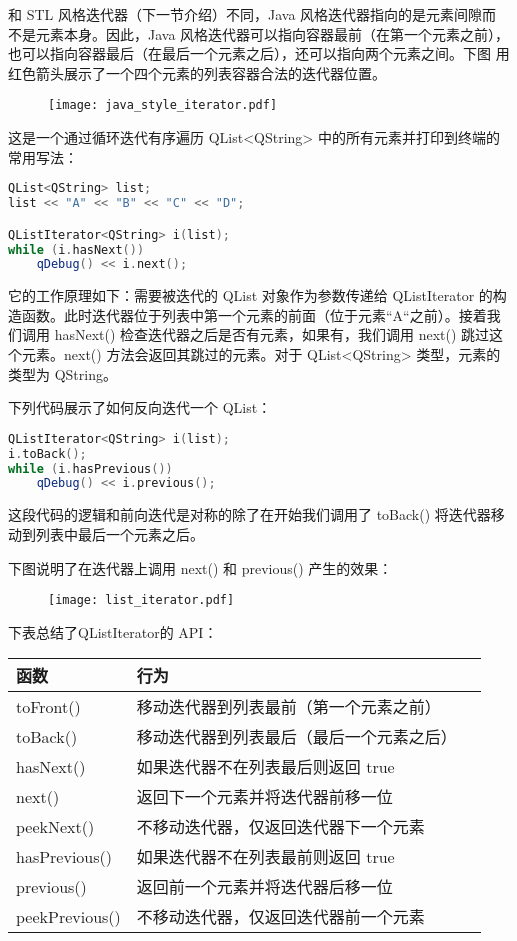 和 STL 风格迭代器（下一节介绍）不同，Java 风格迭代器指向的是元素间隙而
不是元素本身。因此，Java 风格迭代器可以指向容器最前（在第一个元素之前），
也可以指向容器最后（在最后一个元素之后），还可以指向两个元素之间。下图
用红色箭头展示了一个四个元素的列表容器合法的迭代器位置。

\begin{figure}[hbt!]  
	\centering
    \texttt{[image: java\_style\_iterator.pdf]}
\end{figure}

这是一个通过循环迭代有序遍历 QList<QString> 中的所有元素并打印到终端的
常用写法：

\begin{lstlisting}[language=C++]
QList<QString> list;
list << "A" << "B" << "C" << "D";

QListIterator<QString> i(list);
while (i.hasNext())
    qDebug() << i.next();

\end{lstlisting}

它的工作原理如下：需要被迭代的 QList 对象作为参数传递给 QListIterator 的构造函数。此时迭代器位于列表中第一个元素的前面（位于元素“A“之前）。接着我们调用 hasNext() 检查迭代器之后是否有元素，如果有，我们调用 next() 跳过这个元素。next() 方法会返回其跳过的元素。对于 QList<QString> 类型，元素的类型为 QString。

下列代码展示了如何反向迭代一个 QList：

\begin{lstlisting}[language=C++]
QListIterator<QString> i(list);
i.toBack();
while (i.hasPrevious())
    qDebug() << i.previous();

\end{lstlisting}

这段代码的逻辑和前向迭代是对称的除了在开始我们调用了 toBack() 将迭代器移动到列表中最后一个元素之后。

下图说明了在迭代器上调用 next() 和 previous() 产生的效果：

\begin{figure}[hbt!]  
	\centering
    \texttt{[image: list\_iterator.pdf]}
\end{figure}

下表总结了QListIterator的 API：

\begin{tabular}{|l|l|l|}
\hline
函数&	行为\\
\hline
toFront()&	移动迭代器到列表最前（第一个元素之前）\\
\hline
toBack()&	移动迭代器到列表最后（最后一个元素之后）\\
\hline
hasNext()&	如果迭代器不在列表最后则返回 true\\
\hline
next()&	返回下一个元素并将迭代器前移一位\\
\hline
peekNext()&	不移动迭代器，仅返回迭代器下一个元素\\
\hline
hasPrevious()&	如果迭代器不在列表最前则返回 true\\
\hline
previous()&	返回前一个元素并将迭代器后移一位\\
\hline
peekPrevious()&	不移动迭代器，仅返回迭代器前一个元素\\
\hline
\end{tabular}

